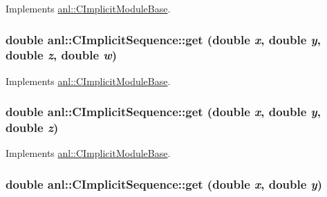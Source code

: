 Implements \hyperlink{classanl_1_1CImplicitModuleBase_aa40b7d54572197612a4fea44b63447eb}{anl::CImplicitModuleBase}.\hypertarget{classanl_1_1CImplicitSequence_a1db8e15397e9bf75176b5f24d57befac}{
\subsubsection[{get}]{\setlength{\rightskip}{0pt plus 5cm}double anl::CImplicitSequence::get (double {\em x}, \/  double {\em y}, \/  double {\em z}, \/  double {\em w})}}
\label{classanl_1_1CImplicitSequence_a1db8e15397e9bf75176b5f24d57befac}


Implements \hyperlink{classanl_1_1CImplicitModuleBase_a3cf520bdab59631864253c03b4e1723f}{anl::CImplicitModuleBase}.\hypertarget{classanl_1_1CImplicitSequence_a9514300a86679a099eccee6b87bfd9c1}{
\subsubsection[{get}]{\setlength{\rightskip}{0pt plus 5cm}double anl::CImplicitSequence::get (double {\em x}, \/  double {\em y}, \/  double {\em z})}}
\label{classanl_1_1CImplicitSequence_a9514300a86679a099eccee6b87bfd9c1}


Implements \hyperlink{classanl_1_1CImplicitModuleBase_ac17d592612c82ba3d47f9229a00b1fe3}{anl::CImplicitModuleBase}.\hypertarget{classanl_1_1CImplicitSequence_a332ee86290e47c570c30fa858b262a9c}{
\subsubsection[{get}]{\setlength{\rightskip}{0pt plus 5cm}double anl::CImplicitSequence::get (double {\em x}, \/  double {\em y})}}
\label{classanl_1_1CImplicitSequence_a332ee86290e47c570c30fa858b262a9c}


